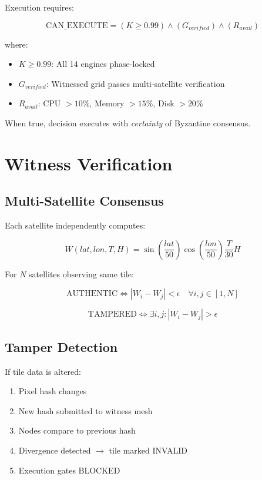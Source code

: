 \documentclass[11pt]{article}
\begin{document}
Execution requires:

\begin{equation}
\text{CAN\_EXECUTE} = (K \geq 0.99) \land (G_{verified}) \land (R_{avail})
\end{equation}

where:
\begin{itemize}
    \item $K \geq 0.99$: All 14 engines phase-locked
    \item $G_{verified}$: Witnessed grid passes multi-satellite verification
    \item $R_{avail}$: CPU $> 10\%$, Memory $> 15\%$, Disk $> 20\%$
\end{itemize}

When true, decision executes with \textit{certainty} of Byzantine consensus.

\section{Witness Verification}

\subsection{Multi-Satellite Consensus}

Each satellite independently computes:

\begin{equation}
W(lat, lon, T, H) = \sin\left(\frac{lat}{50}\right) \cos\left(\frac{lon}{50}\right) \frac{T}{30} H
\end{equation}

For $N$ satellites observing same tile:

\begin{equation}
\text{AUTHENTIC} \iff |W_i - W_j| < \epsilon \quad \forall i, j \in [1, N]
\end{equation}

\begin{equation}
\text{TAMPERED} \iff \exists i, j: |W_i - W_j| > \epsilon
\end{equation}

\subsection{Tamper Detection}

If tile data is altered:
\begin{enumerate}
    \item Pixel hash changes
    \item New hash submitted to witness mesh
    \item Nodes compare to previous hash
    \item Divergence detected $\rightarrow$ tile marked INVALID
    \item Execution gates BLOCKED
\end{enumerate}
\end{document}
